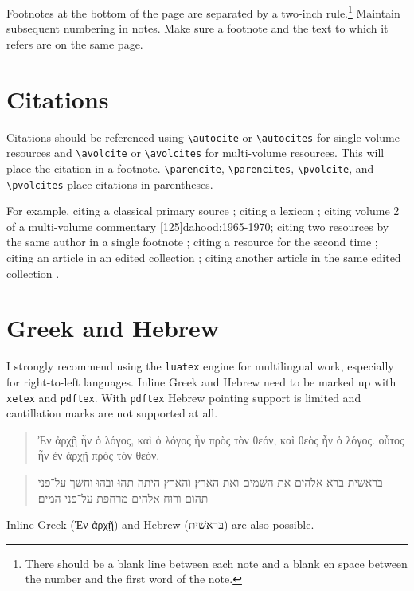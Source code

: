 \documentclass{sblreport}
\begin{document}
Footnotes at the bottom of the page are separated by a two-inch
rule.\footnote{There should be a blank line between each note and a blank en
space between the number and the first word of the note.} Maintain subsequent
numbering in notes. Make sure a footnote and the text to which it refers are
on the same page.

\chapter{Citations}

Citations should be referenced using \verb+\autocite+ or \verb+\autocites+ for
single volume resources and \verb+\avolcite+ or \verb+\avolcites+ for
multi-volume resources. This will place the citation in a footnote.
\verb+\parencite+, \verb+\parencites+, \verb+\pvolcite+, and \verb+\pvolcites+
place citations in parentheses.

For example, citing a classical primary source ;
citing a lexicon \autocite[\foreignlanguage{polytonicgreek}{παρρησία}]{BDAG};
citing volume 2 of a multi-volume commentary
[125]{dahood:1965-1970}; citing two resources by the same author
in a single footnote \autocites[504]{harrington:1970}[241]{harrington:1986};
citing a resource for the second time \autocite[505]{harrington:1970}; citing
an article in an edited collection \autocite{collins:1986}; citing another
article in the same edited collection \autocite{attridge:1986}.

\chapter{Greek and Hebrew}

I strongly recommend using the \texttt{luatex} engine for multilingual work,
especially for right-to-left languages. Inline Greek and Hebrew need to be
marked up with \texttt{xetex} and \texttt{pdftex}. With \texttt{pdftex} Hebrew
pointing support is limited and cantillation marks are not supported at all.
\begin{quotation}
  Ἐν ἀρχῇ ἦν ὁ λόγος, καὶ ὁ λόγος ἦν πρὸς τὸν θεόν, καὶ θεὸς ἦν ὁ λόγος.
  οὗτος ἦν ἐν ἀρχῇ πρὸς τὸν θεόν.
\end{quotation}
\begin{quotation}
  בּראשׁית בּרא אלהים את השּׁמים ואת הארץ׃ והארץ היתה תהוּ ובהוּ וחשׁך על־פּני תהום
  ורוּח אלהים מרחפת על־פּני המּים׃
\end{quotation}
Inline Greek (\foreignlanguage{polytonicgreek}{Ἐν ἀρχῇ}) and Hebrew
(\foreignlanguage{hebrew}{בּראשׁית}) are also possible.
\end{document}
